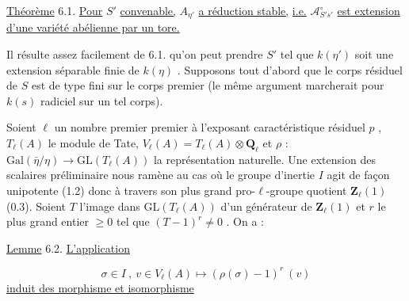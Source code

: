\underline{Théorème} 6.1. \underline{Pour} $S'$ \underline{convenable,} $A_{\eta'}$ \underline{a réduction stable,} \underline{i.e.} $\mathcal{A}^{\circ}_{S's'}$ \underline{est extension d'une variété abélienne par un tore.}

Il résulte assez facilement de 6.1. qu'on peut prendre $S'$ tel que $k(\eta')$ soit une extension séparable finie de $k(\eta)$ . Supposons tout d'abord que le corps résiduel de $S$ est de type fini sur le corps premier (le même argument marcherait pour $k(s)$ radiciel sur un tel corps).

Soient $\ell$ un nombre premier premier à l'exposant caractéristique résiduel $p$ , $T_{\ell}(A)$ le module de Tate, $V_{\ell}(A) = T_{\ell}(A) \otimes \mathbf{Q}_{\ell}$ et $\rho$ : $\mathrm{Gal}(\bar{\eta}/\eta) \longrightarrow \mathrm{GL}(T_{\ell}(A))$ la représentation naturelle. Une extension des scalaires préliminaire  nous ramène au cas où le groupe d'inertie $I$ agit de façon unipotente (1.2) donc à travers son plus grand pro-$\ell$-groupe quotient $\mathbf{Z}_{\ell}(1)$ (0.3). Soient $T$ l'image dans $\mathrm{GL}(T_{\ell}(A))$ d'un générateur de $\mathbf{Z}_{\ell}(1)$ et $r$ le plus grand entier $\geqslant 0$ tel que $(T-1)^{r} \neq 0$ . On a :

\underline{Lemme} 6.2. \underline{L'application}

\begin{equation*}
\sigma \in I \ , \ v \in V_{\ell}(A) \longmapsto (\rho(\sigma)-1)^{r} \ (v)
\end{equation*}
\underline{induit des morphisme et isomorphisme}

